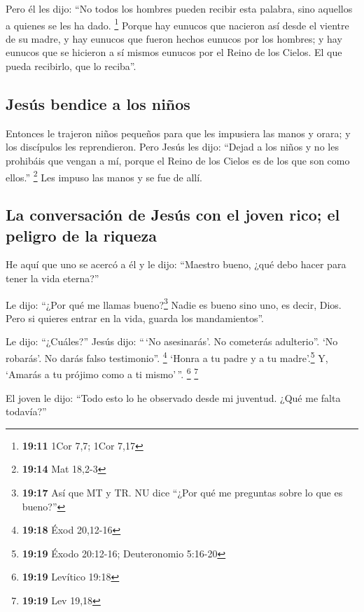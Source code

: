 \begin{paracol}{2}
 Pero él les dijo: ``No todos los hombres pueden recibir
esta palabra, sino aquellos a quienes se les ha dado. \footnote{\textbf{19:11}
  1Cor 7,7; 1Cor 7,17}  Porque hay eunucos que nacieron
así desde el vientre de su madre, y hay eunucos que fueron hechos
eunucos por los hombres; y hay eunucos que se hicieron a sí mismos
eunucos por el Reino de los Cielos. El que pueda recibirlo, que lo
reciba''.

\hypertarget{jesuxfas-bendice-a-los-niuxf1os}{%
\subsection{Jesús bendice a los
niños}\label{jesuxfas-bendice-a-los-niuxf1os}}

 Entonces le trajeron niños pequeños para que les
impusiera las manos y orara; y los discípulos les reprendieron.
 Pero Jesús les dijo: ``Dejad a los niños y no les
prohibáis que vengan a mí, porque el Reino de los Cielos es de los que
son como ellos.'' \footnote{\textbf{19:14} Mat 18,2-3} 
Les impuso las manos y se fue de allí.

\hypertarget{la-conversaciuxf3n-de-jesuxfas-con-el-joven-rico-el-peligro-de-la-riqueza}{%
\subsection{La conversación de Jesús con el joven rico; el peligro de la
riqueza}\label{la-conversaciuxf3n-de-jesuxfas-con-el-joven-rico-el-peligro-de-la-riqueza}}

 He aquí que uno se acercó a él y le dijo: ``Maestro
bueno, ¿qué debo hacer para tener la vida eterna?''

 Le dijo: ``¿Por qué me llamas bueno?\footnote{\textbf{19:17}
  Así que MT y TR. NU dice ``¿Por qué me preguntas sobre lo que es
  bueno?''} Nadie es bueno sino uno, es decir, Dios. Pero si quieres
entrar en la vida, guarda los mandamientos''.

 Le dijo: ``¿Cuáles?'' Jesús dijo: ``\,`No asesinarás'.
No cometerás adulterio''. `No robarás'. No darás falso testimonio''.
\footnote{\textbf{19:18} Éxod 20,12-16}  `Honra a tu
padre y a tu madre'.\footnote{\textbf{19:19} Éxodo 20:12-16;
  Deuteronomio 5:16-20} Y, `Amarás a tu prójimo como a ti mismo'\,''.
\footnote{\textbf{19:19} Levítico 19:18} \footnote{\textbf{19:19} Lev
  19,18}

 El joven le dijo: ``Todo esto lo he observado desde mi
juventud. ¿Qué me falta todavía?''


\end{paracol}

